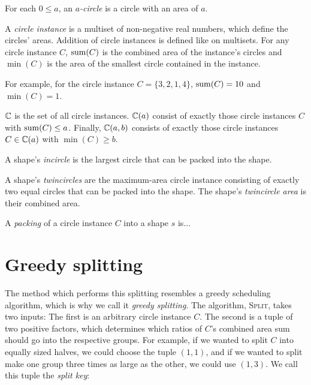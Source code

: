 \documentclass[a4paper,style=print,bibliography=totoc,nexus,lnum,extramargin]{tubsbook}
\begin{document}
\begin{definition}
    For each $0 \le a$, an \emph{$a$-circle} is a circle with an area of $a$.
\end{definition}

\begin{definition}
    A \emph{circle instance} is a multiset of non-negative real numbers, which define the circles' areas. Addition of circle instances is defined like on multisets.
    For any circle instance $C$, $\operatorname{sum}(C)$ is the combined area of the instance's circles and $\min(C)$ is the area of the smallest circle contained in the instance.
\end{definition}

For example, for the circle instance $C = \{3,2,1,4\}$, $\operatorname{sum}(C) = 10$ and $\min(C) = 1$.

\begin{definition}
    $\mathbb{C}$ is the set of all circle instances. $\mathbb{C}(a)$ consist of exactly those circle instances $C$ with $\operatorname{sum}(C) \le a$. Finally, $\mathbb{C}(a,b)$ consists of exactly those circle instances $C \in \mathbb{C}(a)$ with $\min(C) \ge b$.
\end{definition}

\begin{definition}
    A shape's \emph{incircle} is the largest circle that can be packed into the shape.
\end{definition}

\begin{definition}
    A shape's \emph{twincircles} are the maximum-area circle instance consisting of exactly two equal circles that can be packed into the shape. The shape's \emph{twincircle area} is their combined area.
\end{definition}

\begin{definition}
    A \emph{packing} of a circle instance $C$ into a shape $s$ is...
\end{definition}

\section{Greedy splitting}

The method which performs this splitting resembles a greedy scheduling algorithm, which is why we call it \emph{greedy splitting}. The algorithm, \textsc{Split}, takes two inputs: The first is an arbitrary circle instance $C$. The second is a tuple of two positive factors, which determines which ratios of $C$'s combined area sum should go into the respective groups. For example, if we wanted to split $C$ into equally sized halves, we could choose the tuple $(1,1)$, and if we wanted to split make one group three times as large as the other, we could use $(1,3)$. We call this tuple the \emph{split key}:
\end{document}
